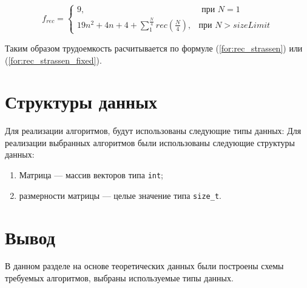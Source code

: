 \begin{equation}
	\label{for:rec_strassen_fixed}
	f_{rec} =
	\begin{cases}
		9, & \text{ при $N = 1$}\\
		19n^2+4n+4 + \sum_{1}^{\frac{N}{4}}{rec(\frac{N}{4})}, & \text{при $N> sizeLimit$}
	\end{cases}
\end{equation}

Таким образом трудоемкость расчитывается по формуле (\ref{for:rec_strassen}) или (\ref{for:rec_strassen_fixed}).






\section{Структуры данных}

Для реализации алгоритмов, будут использованы следующие типы данных:
Для реализации выбранных алгоритмов были использованы следующие структуры данных:
\begin{enumerate}
	\item Матрица --- массив векторов типа \texttt{int};
	\item размерности матрицы --- целые значение типа \texttt{size\_t}.
\end{enumerate}



\section*{Вывод}

В данном разделе на основе теоретических данных были построены схемы требуемых алгоритмов, выбраны используемые типы данных.

